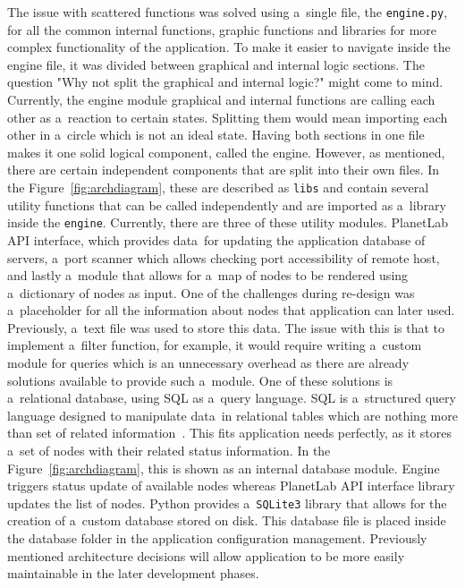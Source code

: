 The issue with scattered functions was solved using a~single file, the \texttt{engine.py}, for all the common internal functions, graphic functions and libraries for more complex functionality of the application. To make it easier to navigate inside the engine file, it was divided between graphical and internal logic sections. The question "Why not split the graphical and internal logic?" might come to mind. Currently, the engine module graphical and internal functions are calling each other as a~reaction to certain states. Splitting them would mean importing each other in a~circle which is not an ideal state. Having both sections in one file makes it one solid logical component, called the engine. However, as mentioned, there are certain independent components that are split into their own files. In the Figure~\ref{fig:archdiagram}, these are described as \texttt{libs} and contain several utility functions that can be called independently and are imported as a~library inside the \texttt{engine}. Currently, there are three of these utility modules. PlanetLab API interface, which provides data~for updating the application database of servers, a~port scanner which allows checking port accessibility of remote host, and lastly a~module that allows for a~map of nodes to be rendered using a~dictionary of nodes as input. One of the challenges during re-design was a~placeholder for all the information about nodes that application can later used. Previously, a~text file was used to store this data. The issue with this is that to implement a~filter function, for example, it would require writing a~custom module for queries which is an unnecessary overhead as there are already solutions available to provide such a~module. One of these solutions is a~relational database, using SQL as a~query language. SQL is a~structured query language designed to manipulate data~in relational tables which are nothing more than set of related information~\cite{Beaulieu:2005:LS:1098720}. This fits application needs perfectly, as it stores a~set of nodes with their related status information. In the Figure~\ref{fig:archdiagram}, this is shown as an internal database module. Engine triggers status update of available nodes whereas PlanetLab API interface library updates the list of nodes. Python provides a~\texttt{SQLite3} library that allows for the creation of a~custom database stored on disk. This database file is placed inside the database folder in the application configuration management. Previously mentioned architecture decisions will allow application to be more easily maintainable in the later development phases.\\

